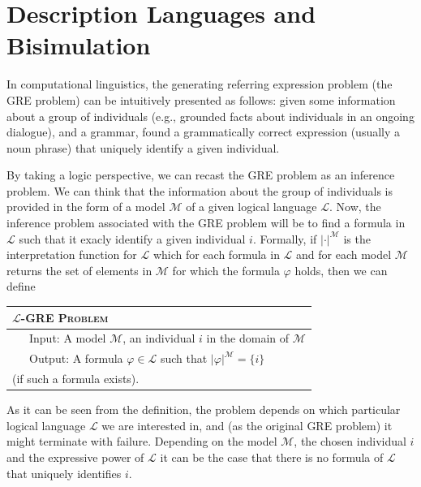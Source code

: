 \newcommand{\gM}{\mathcal{M}}
\newcommand{\gL}{\mathcal{L}}


\section{Description Languages and Bisimulation} \label{sec:bisim}

In computational linguistics, the generating referring expression problem (the GRE
problem) can be intuitively presented as follows: given some information about
a group of individuals (e.g., grounded facts about individuals in an ongoing dialogue),
and a grammar, found a grammatically correct expression (usually a noun phrase) that uniquely identify a given individual.

By taking a logic perspective, we can recast the GRE problem as an inference problem.
We can think that the information about the group of individuals is provided in the form
of a model $\gM$ of a given logical language $\gL$.  Now, the inference problem
associated with the GRE problem will be to find a formula in $\gL$ such that it
exacly identify a given individual $i$.  Formally, if $|\cdot|^\gM$ is the interpretation
function for $\gL$ which for each formula in $\gL$ and for each model $\gM$ returns
the set of elements in $\gM$ for which the formula $\varphi$ holds, then we can define
\medskip

\noindent
{\small
\begin{tabular}{l} \hline
\textsc{$\gL$-GRE Problem}\\ \hline
\ \ \ Input: A model $\gM$, an individual $i$ in the domain of $\gM$\\
\ \ \ Output: A formula $\varphi \in \gL$ such that $|\varphi|^\gM = \{i\}$\\
\hspace*{1.4cm} (if such a formula exists).\\ \hline
\end{tabular}}
\medskip

As it can be seen from the definition, the problem depends on which particular
logical language $\gL$ we are interested in, and (as the original GRE problem)
it might terminate with failure.  Depending on the model $\gM$, the chosen individual $i$
and the expressive power of $\gL$ it can be the case that there is no formula of
$\gL$ that uniquely identifies $i$.

